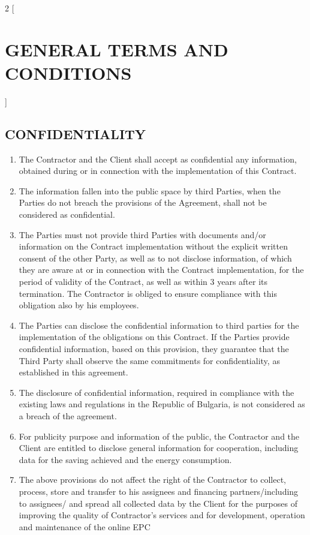 \begin{multicols}{2} [\section{GENERAL TERMS AND CONDITIONS}]
    \subsection{CONFIDENTIALITY}
    \begin{enumerate}
    \item The Contractor and the Client shall accept as confidential
      any information, obtained during or in connection with the
      implementation of this Contract.
    \item The information fallen into the public space by third
      Parties, when the Parties do not breach the provisions of the
      Agreement, shall not be considered as confidential.
    \item The Parties must not provide third Parties with documents
      and/or information on the Contract implementation without the
      explicit written consent of the other Party, as well as to not
      disclose information, of which they are aware at or in
      connection with the Contract implementation, for the period of
      validity of the Contract, as well as within 3 years after its
      termination. The Contractor is obliged to ensure compliance with
      this obligation also by his employees.
    \item The Parties can disclose the confidential information to
      third parties for the implementation of the obligations on this
      Contract. If the Parties provide confidential information, based
      on this provision, they guarantee that the Third Party shall
      observe the same commitments for confidentiality, as established
      in this agreement.
    \item The disclosure of confidential information, required in
      compliance with the existing laws and regulations in the
      Republic of Bulgaria, is not considered as a breach of the
      agreement.
    \item For publicity purpose and information of the public, the
      Contractor and the Client are entitled to disclose general
      information for cooperation, including data for the saving
      achieved and the energy consumption.
    \item The above provisions do not affect the right of the
      Contractor to collect, process, store and transfer to his
      assignees and financing partners/including to assignees/ and
      spread all collected data by the Client for the purposes of
      improving the quality of Contractor’s services and for
      development, operation and maintenance of the online EPC

\end{enumerate}
\end{multicols}
